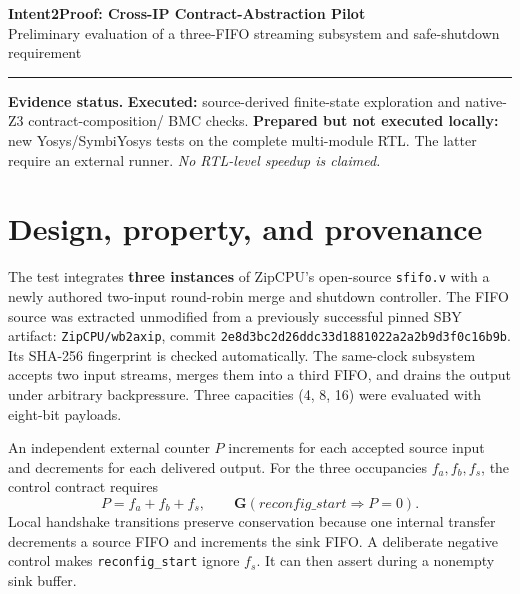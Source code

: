 \documentclass[10pt,letterpaper]{article}
\begin{document}
{\Large\bfseries Intent2Proof: Cross-IP Contract-Abstraction Pilot}\\[3pt]
{\small Preliminary evaluation of a three-FIFO streaming subsystem and safe-shutdown requirement}\\[3pt]
\hrule
\vspace{6pt}
\textbf{Evidence status.} \textbf{Executed:} source-derived finite-state exploration and native-Z3 contract-composition/ BMC checks. \textbf{Prepared but not executed locally:} new Yosys/SymbiYosys tests on the complete multi-module RTL. The latter require an external runner. \emph{No RTL-level speedup is claimed.}

\section*{Design, property, and provenance}
The test integrates \textbf{three instances} of ZipCPU's open-source \texttt{sfifo.v} with a newly authored two-input round-robin merge and shutdown controller. The FIFO source was extracted unmodified from a previously successful pinned SBY artifact: \texttt{ZipCPU/wb2axip}, commit \texttt{2e8d3bc2d26ddc33d1881022a2a2b9d3f0c16b9b}. Its SHA-256 fingerprint is checked automatically. The same-clock subsystem accepts two input streams, merges them into a third FIFO, and drains the output under arbitrary backpressure. Three capacities (4, 8, 16) were evaluated with eight-bit payloads.

An independent external counter $P$ increments for each accepted source input and decrements for each delivered output. For the three occupancies $f_a,f_b,f_s$, the control contract requires
\begin{equation}
 P=f_a+f_b+f_s,\qquad
 \mathbf G(\mathit{reconfig\_start}\Rightarrow P=0). \label{eq:shutdown}
\end{equation}
Local handshake transitions preserve conservation because one internal transfer decrements a source FIFO and increments the sink FIFO. A deliberate negative control makes \texttt{reconfig\_start} ignore $f_s$. It can then assert during a nonempty sink buffer.
\end{document}
